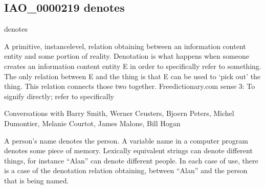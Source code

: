 \documentclass[letterpaper,10pt,english]{sphinxmanual}
\begin{document}
\subsection{IAO\_0000219 \sphinxhyphen{} denotes}
\label{\detokenize{doc-IAO_0000219:iao-0000219-denotes}}\label{\detokenize{doc-IAO_0000219:index-0}}\label{\detokenize{doc-IAO_0000219::doc}}
\begin{sphinxShadowBox}

\sphinxAtStartPar
denotes
\end{sphinxShadowBox}

\begin{sphinxShadowBox}

\sphinxAtStartPar
{\hyperref[\detokenize{doc-IAO_0000136::doc}]{}}
\end{sphinxShadowBox}

\begin{sphinxShadowBox}

\sphinxAtStartPar
A primitive, instance\sphinxhyphen{}level, relation obtaining between an information content entity and some portion of reality. Denotation is what happens when someone creates an information content entity E in order to specifically refer to something. The only relation between E and the thing is that E can be used to ‘pick out’ the thing. This relation connects those two together. Freedictionary.com sense 3: To signify directly; refer to specifically
\end{sphinxShadowBox}

\begin{sphinxShadowBox}

\sphinxAtStartPar
Conversations with Barry Smith, Werner Ceusters, Bjoern Peters, Michel Dumontier, Melanie Courtot, James Malone, Bill Hogan
\end{sphinxShadowBox}

\begin{sphinxShadowBox}

\sphinxAtStartPar
A person’s name denotes the person. A variable name in a computer program denotes some piece of memory. Lexically equivalent strings can denote different things, for instance “Alan” can denote different people. In each case of use, there is a case of the denotation relation obtaining, between “Alan” and the person that is being named.
\end{sphinxShadowBox}
\end{document}
